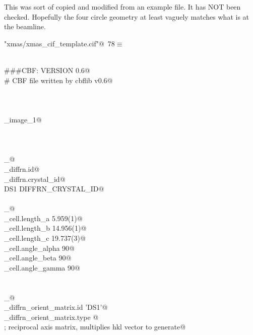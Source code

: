 \documentclass[10pt,a4paper,twoside,notitlepage]{article}
\begin{document}
This was sort of copied and modified from an example file. It has NOT been checked.
Hopefully the four circle geometry at least vaguely matches what is at the beamline.

\begin{flushleft} \small
\begin{minipage}{\linewidth}\label{scrap20}\raggedright\small
{} \verb@"xmas/xmas_cif_template.cif"@\nobreak\ {\footnotesize {78}}$\equiv$
\vspace{-1ex}
\begin{list}{}{} \item
\mbox{}\verb@@\\
\mbox{}\verb@###CBF: VERSION 0.6@\\
\mbox{}\verb@# CBF file written by cbflib v0.6@\\
\mbox{}\verb@@\\
\mbox{}\verb@@\\
\mbox{}\verb@@\\
\mbox{}\verb@data_image_1@\\
\mbox{}\verb@@\\
\mbox{}\verb@@\\
\mbox{}\verb@@\\
\mbox{}\verb@loop_@\\
\mbox{}\verb@_diffrn.id@\\
\mbox{}\verb@_diffrn.crystal_id@\\
\mbox{}\verb@ DS1 DIFFRN_CRYSTAL_ID@\\
\mbox{}\verb@@\\
\mbox{}\verb@loop_@\\
\mbox{}\verb@_cell.length_a                     5.959(1)@\\
\mbox{}\verb@_cell.length_b                     14.956(1)@\\
\mbox{}\verb@_cell.length_c                     19.737(3)@\\
\mbox{}\verb@_cell.angle_alpha                  90@\\
\mbox{}\verb@_cell.angle_beta                   90@\\
\mbox{}\verb@_cell.angle_gamma                  90@\\
\mbox{}\verb@@\\
\mbox{}\verb@@\\
\mbox{}\verb@loop_@\\
\mbox{}\verb@_diffrn_orient_matrix.id 'DS1'@\\
\mbox{}\verb@_diffrn_orient_matrix.type @\\
\mbox{}\verb@; reciprocal axis matrix, multiplies hkl vector to generate@\\

\end{list}
\end{minipage}
\end{flushleft}
\end{document}
